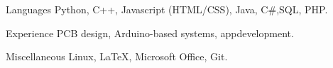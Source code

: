 

\begin{cvskills}

  \cvskill
    {Languages}
    {Python, C++, Javascript (HTML/CSS), Java, C\#,\newline\hspace{-6.7em}SQL, PHP.}

  \cvskill
  	{Experience}
  	{PCB design, Arduino-based systems, app\newline\hspace{-6.75em}development.}

  \cvskill
    {Miscellaneous}
    {Linux, \LaTeX, Microsoft Office, Git.}

\end{cvskills}
